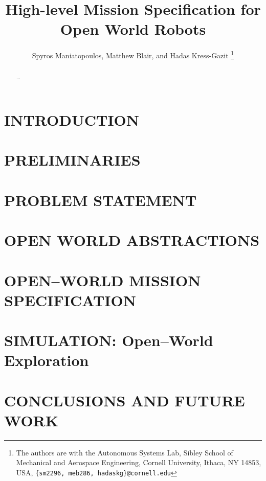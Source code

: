 \documentclass[letterpaper, 10 pt, conference]{ieeeconf}  %
\title{\LARGE \bf
	High-level Mission Specification for Open World Robots
}
\author{Spyros Maniatopoulos, Matthew Blair, and Hadas Kress-Gazit%
\thanks{The authors are with the Autonomous Systems Lab, Sibley School of Mechanical and Aerospace Engineering, Cornell University, Ithaca, NY 14853, USA, {\tt \{sm2296, meb286, hadaskg\}\nolinkurl{@cornell.edu}}}%
}
\begin{document}
\maketitle
\thispagestyle{empty}
\pagestyle{empty}


\begin{abstract}

\ldots

\end{abstract}


\section{INTRODUCTION}


\section{PRELIMINARIES}\label{preliminaries}


\section{PROBLEM STATEMENT}\label{problem}


\section{OPEN WORLD ABSTRACTIONS}\label{abstractions}


\section{OPEN--WORLD MISSION SPECIFICATION}\label{openworld}


\section{SIMULATION: Open--World Exploration}\label{simulation}  %


\section{CONCLUSIONS AND FUTURE WORK}\label{conclusion}

\end{document}
